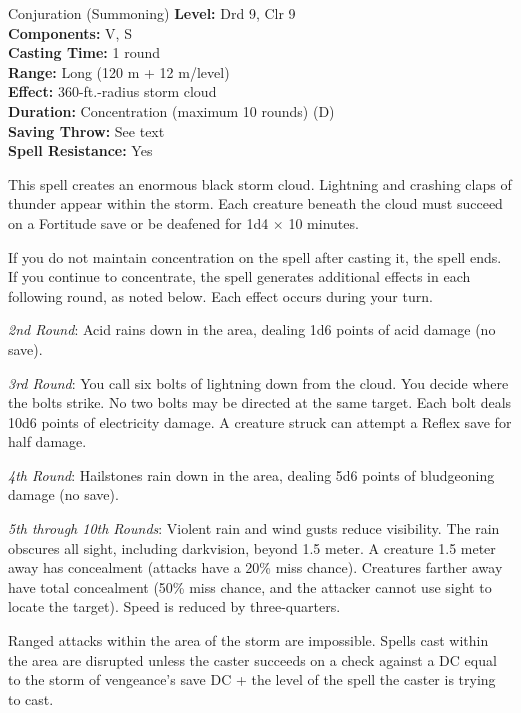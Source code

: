 {Conjuration (Summoning)}
{
	\textbf{Level:}
	Drd 9, Clr 9\\
	\textbf{Components:}
	V, S\\
	\textbf{Casting Time:}
	1 round\\
	\textbf{Range:}
	Long (120 m + 12 m/level)\\
	\textbf{Effect:}
	360-ft.-radius storm cloud\\
	\textbf{Duration:}
	Concentration (maximum 10 rounds) (D)\\
	\textbf{Saving Throw:}
	See text\\
	\textbf{Spell Resistance:}
	Yes\\
}
{
	This spell creates an enormous black storm cloud. Lightning and crashing claps of thunder appear within the storm. Each creature beneath the cloud must succeed on a Fortitude save or be deafened for 1d4 $\times$ 10 minutes.

	If you do not maintain concentration on the spell after casting it, the spell ends.  If you continue to concentrate, the spell generates additional effects in each following round, as noted below. Each effect occurs during your turn.

	\textit{2nd Round}:
	Acid rains down in the area, dealing 1d6 points of acid damage (no save).

	\textit{3rd Round}:
	You call six bolts of lightning down from the cloud. You decide where the bolts strike. No two bolts may be directed at the same target. Each bolt deals 10d6 points of electricity damage. A creature struck can attempt a Reflex save for half damage.

	\textit{4th Round}:
	Hailstones rain down in the area, dealing 5d6 points of bludgeoning damage (no save).

	\textit{5th through 10th Rounds}:
	Violent rain and wind gusts reduce visibility. The rain obscures all sight, including darkvision, beyond 1.5 meter. A creature 1.5 meter away has concealment (attacks have a 20\% miss chance). Creatures farther away have total concealment (50\% miss chance, and the attacker cannot use sight to locate the target). Speed is reduced by three-quarters.

	Ranged attacks within the area of the storm are impossible. Spells cast within the area are disrupted unless the caster succeeds on a  check against a DC equal to the storm of vengeance's save DC + the level of the spell the caster is trying to cast.

}
